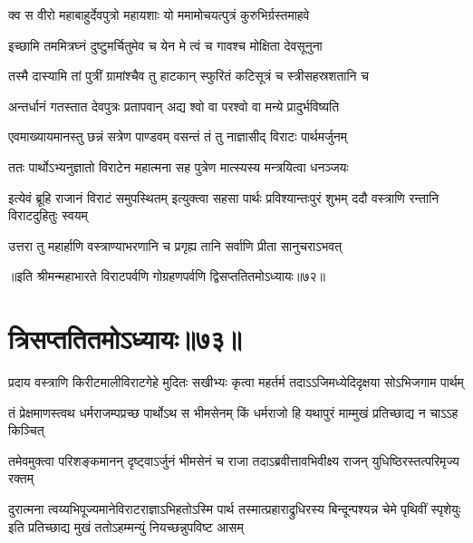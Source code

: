 


\twolineshloka
{क्व स वीरो महाबाहुर्देवपुत्रो महायशाः}
{यो ममामोचयत्पुत्रं कुरुभिर्ग्रस्तमाहवे}


\twolineshloka
{इच्छामि तममित्रघ्नं दुष्टुमर्चितुमेव च}
{येन मे त्वं च गावश्च मोक्षिता देवसूनुना}


\twolineshloka
{तस्मै दास्यामि तां पुत्रीं ग्रामांश्चैव तु हाटकान्}
{स्फुरितं कटिसूत्रं च स्त्रीसहस्रशतानि च}




\twolineshloka
{अन्तर्धानं गतस्तात देवपुत्रः प्रतापवान्}
{अद्य श्वो वा परश्वो वा मन्ये प्रादुर्भविष्यति}



\twolineshloka
{एवमाख्यायमानस्तु छन्नं सत्रेण पाण्डवम्}
{वसन्तं तं तु नाज्ञासीद् विराटः पार्थमर्जुनम्}


\twolineshloka
{ततः पार्थोऽभ्यनुज्ञातो विराटेन महात्मना}
{सह पुत्रेण मात्स्यस्य मन्त्रयित्वा धनञ्जयः}


\threelineshloka
{इत्येवं ब्रूहि राजानं विराटं समुपस्थितम्}
{इत्युक्त्वा सहसा पार्थः प्रविश्यान्तःपुरं शुभम्}
{ददौ वस्त्राणि रन्तानि विराटदुहितुः स्वयम्}


\twolineshloka
{उत्तरा तु महार्हाणि वस्त्राण्याभरणानि च}
{प्रगृह्य तानि सर्वाणि प्रीता सानुचराऽभवत्}

॥इति श्रीमन्महाभारते विराटपर्वणि गोग्रहणपर्वणि द्विसप्ततितमोऽध्यायः॥७२॥

\chapter{त्रिसप्ततितमोऽध्यायः॥७३॥ }

\twolineshloka
{प्रदाय वस्त्राणि किरीटमालीविराटगेहे मुदितः सखीभ्यः}
{कृत्वा महर्तर्म तदाऽऽजिमध्येदिदृक्षया सोऽभिजगाम पार्थम्}


\twolineshloka
{तं प्रेक्षमाणस्त्वथ धर्मराजम्पप्रच्छ पार्थोऽथ स भीमसेनम्}
{किं धर्मराजो हि यथापुरं माम्मुखं प्रतिच्छाद्य न चाऽऽह किञ्चित्}


\fourlineindentedshloka
{तमेवमुक्त्वा परिशङ्कमानन्}
{दृष्ट्वाऽर्जुनं भीमसेनं च राजा}
{तदाऽब्रवीत्तावभिवीक्ष्य राजन्}
{युधिष्ठिरस्तत्परिमृज्य रक्तम्}


\threelineshloka
{दुरात्मना त्वय्यभिपूज्यमानेविराटराज्ञाऽभिहतोऽस्मि पार्थ}
{तस्मात्प्रहाराद्रुधिरस्य बिन्दून्पश्यन्न चेमे पृथिवीं स्पृशेयुः}
{इति प्रतिच्छाद्य मुखं ततोऽहम्मन्युं नियच्छन्नुपविष्ट आसम्}


